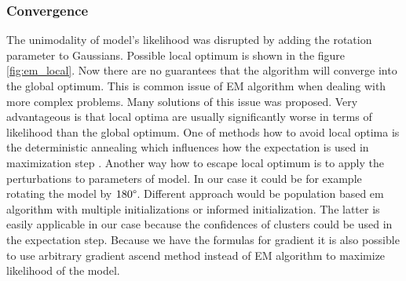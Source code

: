 \subsubsection{Convergence}
The unimodality of model's likelihood was disrupted by adding the rotation parameter to Gaussians. Possible local optimum is shown in the figure \ref{fig:em_local}. Now there are no guarantees that the algorithm will converge into the global optimum. This is common issue of EM algorithm when dealing with more complex problems. Many solutions of this issue was proposed. Very advantageous is that local optima are usually significantly worse in terms of likelihood than the global optimum. One of methods how to avoid local optima is the deterministic annealing which influences how the expectation is used in maximization step \cite{ueda1998}. Another way how to escape local optimum is to apply the perturbations to parameters of model. In our case it could be for example rotating the model by $180\degree$. Different approach would be population based em algorithm with multiple initializations or informed initialization. The latter is easily applicable in our case because the confidences of clusters could be used in the expectation step. Because we have the formulas for gradient it is also possible to use arbitrary gradient ascend method instead of EM algorithm to maximize likelihood of the model.

